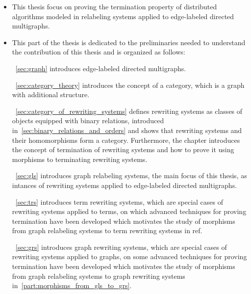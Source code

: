 \begin{itemize}
    \item This thesis focus on proving the termination property of distributed algorithms modeled in relabeling systems applied to edge-labeled directed multigraphs. 
    \item This part of the thesis is dedicated to the preliminaries needed to understand the contribution of this thesis and is organized as follows:
    
   ~\autoref{sec:graph} introduces edge-labeled directed multigraphs. 
    
   ~\autoref{sec:category_theory} introduces the concept of a category, which is a graph with additional structure.

   ~\autoref{sec:category_of_rewriting_systems} defines rewriting systems as classes of objects equipped with binary relations, introduced in~\autoref{sec:binary_relations_and_orders} and shows that rewriting systems and their homomorphisms form a category. Furthermore, the chapter introduces the concept of termination of rewriting systems and how to prove it using morphisms to terminating rewriting systems.

   ~\autoref{sec:gls} introduces graph relabeling systems, the main focus of this thesis,
     as intances of rewriting systems applied to edge-labeled directed multigraphs.

   ~\autoref{sec:trs} introduces term rewriting systems, which are special cases of rewriting systems applied to terms, on which advanced techniques for proving termination have been developed which motivates the study of morphisms from graph relabeling systems to term rewriting systems in ref.

   ~\autoref{sec:grs} introduces graph rewriting systems, which are special cases of rewriting systems applied to graphs, on some advanced techniques for proving termination have been developed which motivates the study of morphisms from graph relabeling systems to graph rewriting systems in~\autoref{part:morphisms_from_gls_to_grs}.

\end{itemize}